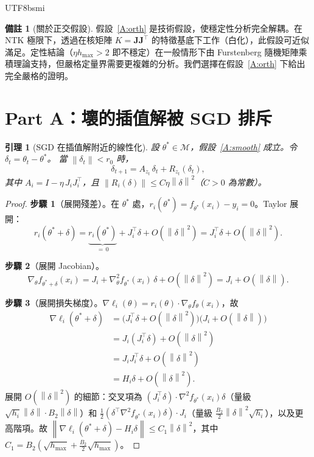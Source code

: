 \documentclass[11pt,a4paper]{article}
\newtheorem{lemma}[theorem]{引理}
\theoremstyle{definition}
\newtheorem{remark}[theorem]{備註}
\newcommand{\cM}{\mathcal{M}}
\newcommand{\bJ}{\mathbf{J}}
\newcommand{\norm}[1]{\left\|#1\right\|}
\begin{document}
\begin{CJK}{UTF8}{bsmi}
\begin{remark}[關於正交假設]
  假設~\ref{A:orth} 是技術假設，使穩定性分析完全解耦。在 NTK 極限下，透過在核矩陣 $K=\bJ\bJ^\top$ 的特徵基底下工作（白化），此假設可近似滿足。定性結論（$\eta h_{\max}>2$ 即不穩定）在一般情形下由 Furstenberg 隨機矩陣乘積理論支持，但嚴格定量界需要更複雜的分析。我們選擇在假設~\ref{A:orth} 下給出完全嚴格的證明。
\end{remark}

\section{Part A：壞的插值解被 SGD 排斥}

\begin{lemma}[SGD 在插值解附近的線性化]\label{lem:lin}
  設 $\theta^*\in\cM$，假設~\ref{A:smooth} 成立。令 $\delta_t=\theta_t-\theta^*$。
  當 $\norm{\delta_t}<r_0$ 時，
  \[
    \delta_{t+1}=A_{z_t}\,\delta_t+R_{z_t}(\delta_t),
  \]
  其中 $A_i=I-\eta\,J_iJ_i^\top$，且 $\norm{R_i(\delta)}\leq C\eta\norm{\delta}^2$（$C>0$ 為常數）。
\end{lemma}

\begin{proof}
  \textbf{步驟 1}（展開殘差）。在 $\theta^*$ 處，$r_i(\theta^*)=f_{\theta^*}(x_i)-y_i=0$。Taylor 展開：
  \[
    r_i(\theta^*+\delta)=\underbrace{r_i(\theta^*)}_{=\,0}+J_i^\top\delta+O(\norm{\delta}^2)
    =J_i^\top\delta+O(\norm{\delta}^2).
  \]

  \textbf{步驟 2}（展開 Jacobian）。
  \[
    \nabla_\theta f_{\theta^*+\delta}(x_i)=J_i+\nabla^2_\theta f_{\theta^*}(x_i)\,\delta+O(\norm{\delta}^2)
    =J_i+O(\norm{\delta}).
  \]

  \textbf{步驟 3}（展開損失梯度）。$\nabla\ell_i(\theta)=r_i(\theta)\cdot\nabla_\theta f_\theta(x_i)$，故
  \begin{align*}
    \nabla\ell_i(\theta^*+\delta)
    &=\bigl(J_i^\top\delta+O(\norm{\delta}^2)\bigr)\bigl(J_i+O(\norm{\delta})\bigr)\\
    &=J_i(J_i^\top\delta)+O(\norm{\delta}^2)\\
    &=J_iJ_i^\top\delta+O(\norm{\delta}^2)\\
    &=H_i\delta+O(\norm{\delta}^2).
  \end{align*}
  展開 $O(\norm{\delta}^2)$ 的細節：交叉項為 $(J_i^\top\delta)\cdot\nabla^2 f_{\theta^*}(x_i)\delta$（量級 $\sqrt{h_i}\norm{\delta}\cdot B_2\norm{\delta}$）和 $\frac{1}{2}(\delta^\top\nabla^2 f_{\theta^*}(x_i)\delta)\cdot J_i$（量級 $\frac{B_2}{2}\norm{\delta}^2\sqrt{h_i}$），以及更高階項。故 $\norm{\nabla\ell_i(\theta^*+\delta)-H_i\delta}\leq C_1\norm{\delta}^2$，其中 $C_1=B_2(\sqrt{h_{\max}}+\frac{B_2}{2}\sqrt{h_{\max}})$。


\end{proof}
\end{CJK}
\end{document}
